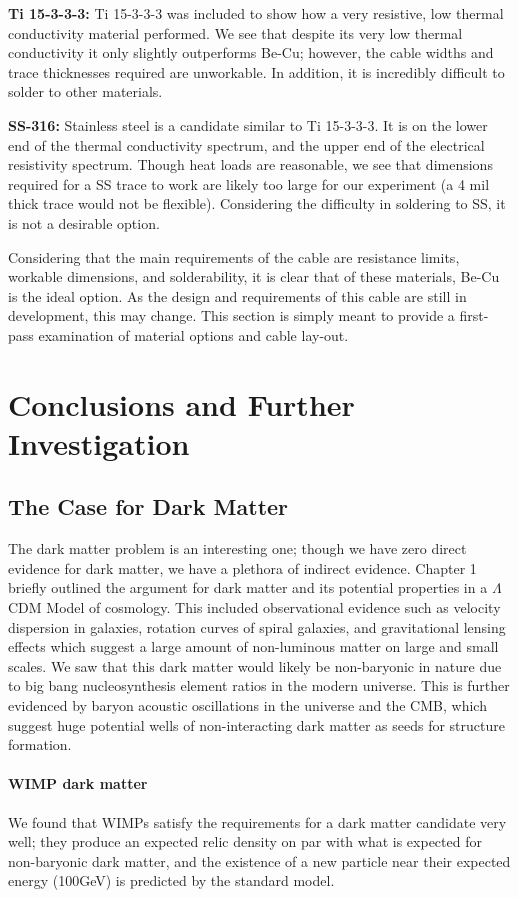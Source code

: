 \documentclass{report}
\begin{document}
\textbf{Ti 15-3-3-3:} Ti 15-3-3-3 was included to show how a very resistive, low thermal conductivity material performed. We see that despite its very low thermal conductivity it only slightly outperforms Be-Cu; however, the cable widths and trace thicknesses required are unworkable. In addition, it is incredibly difficult to solder to other materials.

\textbf{SS-316:} Stainless steel is a candidate similar to Ti 15-3-3-3. It is on the lower end of the thermal conductivity spectrum, and the upper end of the electrical resistivity spectrum. Though heat loads are reasonable, we see that dimensions required for a SS trace to work are likely too large for our experiment (a 4 mil thick trace would not be flexible). Considering the difficulty in soldering to SS, it is not a desirable option.

Considering that the main requirements of the cable are resistance limits, workable dimensions, and solderability, it is clear that of these materials, Be-Cu is the ideal option. As the design and requirements of this cable are still in development, this may change. This section is simply meant to provide a first-pass examination of material options and cable lay-out.

\chapter{Conclusions and Further Investigation}

\section{The Case for Dark Matter}
The dark matter problem is an interesting one; though we have zero direct evidence for dark matter, we have a plethora of indirect evidence. Chapter 1 briefly outlined the argument for dark matter and its potential properties in a $\Lambda$CDM Model of cosmology. This included observational evidence such as velocity dispersion in galaxies, rotation curves of spiral galaxies, and gravitational lensing effects which suggest a large amount of non-luminous matter on large and small scales. We saw that this dark matter would likely be non-baryonic in nature due to big bang nucleosynthesis element ratios in the modern universe. This is further evidenced by baryon acoustic oscillations in the universe and the CMB, which suggest huge potential wells of non-interacting dark matter as seeds for structure formation.

\subsubsection{WIMP dark matter}
We found that WIMPs satisfy the requirements for a dark matter candidate very well; they produce an expected relic density on par with what is expected for non-baryonic dark matter, and the existence of a new particle near their expected energy (100GeV) is predicted by the standard model.
\end{document}
